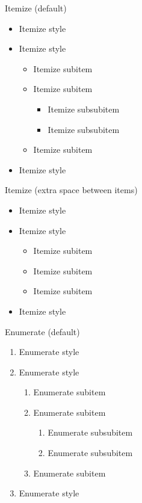 \documentclass[10pt,t]{beamer}
\begin{document}
\begin{frame}{Itemize}
(default)
\begin{itemize}
	\item Itemize style
	\item Itemize style
	\begin{itemize}
		\item Itemize subitem 
		\item Itemize subitem
			\begin{itemize}
				\item Itemize subsubitem
				\item Itemize subsubitem
			\end{itemize}
		\item Itemize subitem	
	\end{itemize}
	\item Itemize style
\end{itemize}
\end{frame}




\begin{frame}{Itemize}
(extra space between items)
\begin{itemize}
	\itemsep 20pt
	\item Itemize style
	\item Itemize style
	\begin{itemize}
		\itemsep 10pt
		\item Itemize subitem
		\item Itemize subitem
		\item Itemize subitem	
	\end{itemize}
	\item Itemize style
\end{itemize}
\end{frame}




\begin{frame}{Enumerate}
(default)
\begin{enumerate}
	\item Enumerate style
	\item Enumerate style
	\begin{enumerate}
		\item Enumerate subitem
		\item Enumerate subitem
		\begin{enumerate}
			\item Enumerate subsubitem
			\item Enumerate subsubitem
		\end{enumerate}
		\item Enumerate subitem
	\end{enumerate}
	\item Enumerate style
\end{enumerate}
\end{frame}
\end{document}
